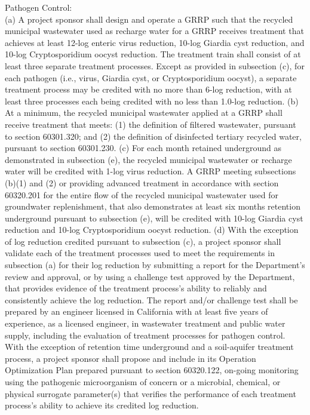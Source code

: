 \item Pathogen Control:\\
(a) A project sponsor shall design and operate a GRRP such that the recycled municipal wastewater used as recharge water for a GRRP receives treatment that achieves at least 12-log enteric virus reduction, 10-log Giardia cyst reduction, and 10-log Cryptosporidium oocyst reduction. The treatment train shall consist of at least three separate treatment processes. Except as provided in subsection (c), for each pathogen (i.e., virus, Giardia cyst, or Cryptosporidium oocyst), a separate treatment process may be credited with no more than 6-log reduction, with at least three processes each being credited with no less than 1.0-log reduction.
(b) At a minimum, the recycled municipal wastewater applied at a GRRP shall receive treatment that meets:
(1) the definition of filtered wastewater, pursuant to section 60301.320; and
(2) the definition of disinfected tertiary recycled water, pursuant to section 60301.230.
(c) For each month retained underground as demonstrated in subsection (e), the recycled municipal wastewater or recharge water will be credited with 1-log virus reduction. A GRRP meeting subsections (b)(1) and (2) or providing advanced treatment in accordance with section 60320.201 for the entire flow of the recycled municipal wastewater used for groundwater replenishment, that also demonstrates at least six months retention underground pursuant to subsection (e), will be credited with 10-log Giardia cyst reduction and 10-log Cryptosporidium oocyst reduction.
(d) With the exception of log reduction credited pursuant to subsection (c), a project sponsor shall validate each of the treatment processes used to meet the requirements in subsection (a) for their log reduction by submitting a report for the Department's review and approval, or by using a challenge test approved by the Department, that provides evidence of the treatment process's ability to reliably and consistently achieve the log reduction. The report and/or challenge test shall be prepared by an engineer licensed in California with at least five years of experience, as a licensed engineer, in wastewater treatment and public water supply, including the evaluation of treatment processes for pathogen control. With the exception of retention time underground and a soil-aquifer treatment process, a project sponsor shall propose and include in its Operation Optimization Plan prepared pursuant to section 60320.122, on-going monitoring using the pathogenic microorganism of concern or a microbial, chemical, or physical surrogate parameter(s) that verifies the performance of each treatment process's ability to achieve its credited log reduction.
